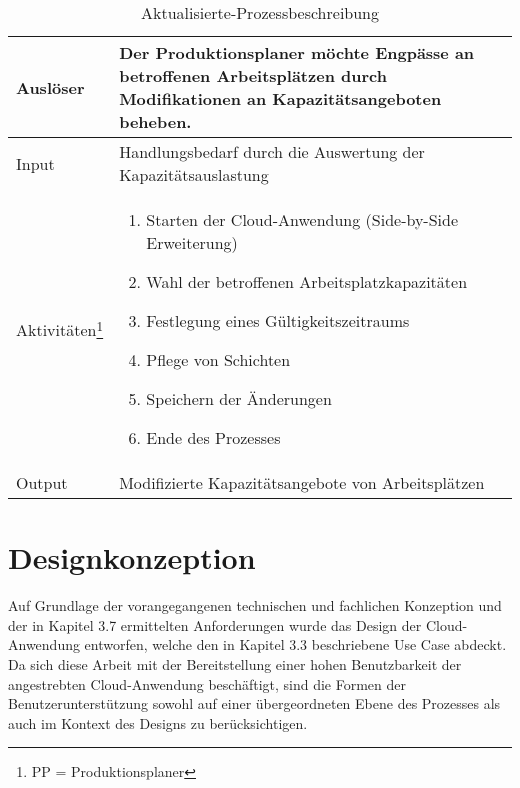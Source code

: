 \begin{table}[H]
	\centering
	\begin{tabularx}{\textwidth}{|l|X|} 
		\hline
		Auslöser                                     &   
		Der Produktionsplaner möchte Engpässe an betroffenen Arbeitsplätzen durch Modifikationen an Kapazitätsangeboten beheben.  \\ 
		\hline\hline
		Input                                         &   
		Handlungsbedarf durch die Auswertung der Kapazitätsauslastung  \\ 
		\hline\hline
		Aktivitäten\footnote{PP = Produktionsplaner} &   
		\begin{minipage}{5in}
		\begin{enumerate} 
		\renewcommand{\labelenumi}{(\arabic{enumi})}
		\item Starten der Cloud-Anwendung (Side-by-Side Erweiterung)
    	\item Wahl der betroffenen Arbeitsplatzkapazitäten
    	\item Festlegung eines Gültigkeitszeitraums
    	\item Pflege von Schichten
        \item Speichern der Änderungen
    	\item Ende des Prozesses
		\end{enumerate}
		\vspace{1pt}		\end{minipage} \\
		\hline\hline
		Output                                        &   
		Modifizierte Kapazitätsangebote von Arbeitsplätzen  \\
		\hline
	\end{tabularx}
	\caption{\label{tab:aktivitäten_nachher}Aktualisierte-Prozessbeschreibung}
\end{table}

% 
% 
% 
% 
% 
% 
\section{Designkonzeption}
Auf Grundlage der vorangegangenen technischen und fachlichen Konzeption und der in Kapitel 3.7 ermittelten Anforderungen wurde das Design der Cloud-Anwendung entworfen, welche den in Kapitel 3.3 beschriebene Use Case abdeckt. Da sich diese Arbeit mit der Bereitstellung einer hohen Benutzbarkeit der angestrebten Cloud-Anwendung beschäftigt, sind die Formen der Benutzerunterstützung sowohl auf einer übergeordneten Ebene des Prozesses als auch im Kontext des Designs zu berücksichtigen.

